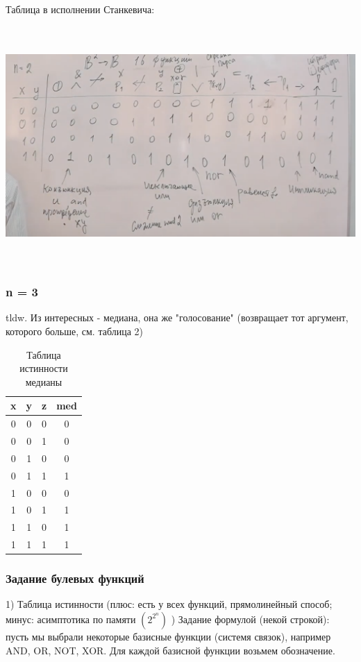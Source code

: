 Таблица в исполнении Станкевича:
\begin{center}
  \includegraphics[height=9.1cm]{assets/2-2-1.png}
\end{center}

\subsubsection{n = 3}
tldw.
Из интересных - медиана, она же "голосование" (возвращает тот аргумент, которого больше, см. таблица 2)


\begin{table}
    \centering
    \begin{tabular}{ |c|c|c|c| }
        \hline
         x & y & z & med \\
        \hline
         0 & 0 & 0 & 0 \\
         0 & 0 & 1 & 0 \\
         0 & 1 & 0 & 0 \\
         0 & 1 & 1 & 1 \\
         1 & 0 & 0 & 0 \\
         1 & 0 & 1 & 1 \\
         1 & 1 & 0 & 1 \\
         1 & 1 & 1 & 1 \\
        \hline
    \end{tabular}
    \caption{Таблица истинности медианы}
\end{table}

\subsubsection{Задание булевых функций}
1) Таблица истинности (плюс: есть у всех функций, прямолинейный способ; минус: асимптотика по памяти $(2^{2^{n}})$ ) Задание формулой (некой строкой): пусть мы выбрали некоторые базисные функции (системя связок), например AND, OR, NOT, XOR. Для каждой базисной функции возьмем обозначение.

